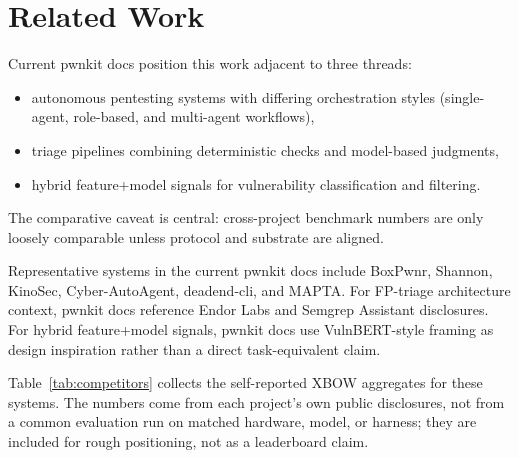 \documentclass[11pt]{article}
\begin{document}
\section{Related Work}

Current pwnkit docs position this work adjacent to three threads:

\begin{itemize}
  \item autonomous pentesting systems with differing orchestration styles
  (single-agent, role-based, and multi-agent workflows),
  \item triage pipelines combining deterministic checks and model-based
  judgments,
  \item hybrid feature+model signals for vulnerability classification and
  filtering.
\end{itemize}

The comparative caveat is central: cross-project benchmark numbers are only
loosely comparable unless protocol and substrate are aligned.

Representative systems in the current pwnkit docs include BoxPwnr, Shannon,
KinoSec, Cyber-AutoAgent, deadend-cli, and
MAPTA\citep{boxpwnr,shannon,kinosec,cyberautoagent,deadend,mapta}.
For FP-triage architecture context, pwnkit docs reference Endor Labs and
Semgrep Assistant disclosures\citep{endor,semgrep}. For hybrid feature+model
signals, pwnkit docs use VulnBERT-style framing as design inspiration rather
than a direct task-equivalent claim\citep{vulnbert}.

Table~\ref{tab:competitors} collects the self-reported XBOW aggregates for
these systems. The numbers come from each project's own public disclosures,
not from a common evaluation run on matched hardware, model, or harness; they
are included for rough positioning, not as a leaderboard claim.
\end{document}
